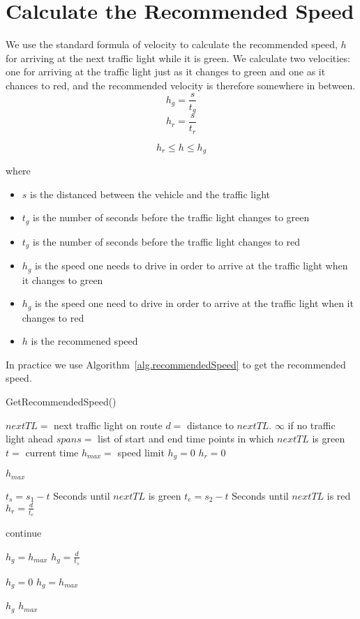 \section{Calculate the Recommended Speed}

We use the standard formula of velocity to calculate the recommended speed, $h$ for arriving at the next traffic light while it is green.
We calculate two velocities: one for arriving at the traffic light just as it changes to green and one as it chances to red, and the recommended velocity is therefore somewhere in between.
\[h_g = \frac{s}{t_g}\]
\[h_r = \frac{s}{t_r}\]

\[h_r \leq h \leq h_g\]

where
\begin{itemize}
\item $s$ is the distanced between the vehicle and the traffic light
\item $t_g$ is the number of seconds before the traffic light changes to green
\item $t_g$ is the number of seconds before the traffic light changes to red
\item $h_g$ is the speed one needs to drive in order to arrive at the traffic light when it changes to green
\item $h_g$ is the speed one need to drive in order to arrive at the traffic light when it changes to red
\item $h$ is the recommened speed
\end{itemize}

In practice we use Algorithm~\ref{alg.recommendedSpeed} to get the recommended speed.

\begin{algorithm}
\caption{GetRecommendedSpeed()}\label{alg.recommendedSpeed}
\begin{algorithmic}
\State $nextTL = $ next traffic light on route
\State $d=$ distance to $nextTL$. $\infty$ if no traffic light ahead
\State $spans = $ list of start and end time points in which $nextTL$ is green
\State $t=$ current time
\State $h_{max} = $ speed limit
\State $h_g = 0$
\State $h_r = 0$

\Return $h_{max}$
\EndIf

\State $t_s = s_1 - t$ \Comment Seconds until $nextTL$ is green
\State $t_e = s_2 - t$ \Comment Seconds until $nextTL$ is red
\State $h_r = \frac{d}{t_e}$

\State continue
\EndIf

\State $h_g=h_{max}$
\Else
\State $h_g = \frac{d}{t_s}$
\EndIf

\State $h_g = 0$
\State $h_g=h_{max}$
\EndIf

\State\Return $h_g$
\EndFor
\State\Return $h_{max}$

\end{algorithmic}
\end{algorithm}